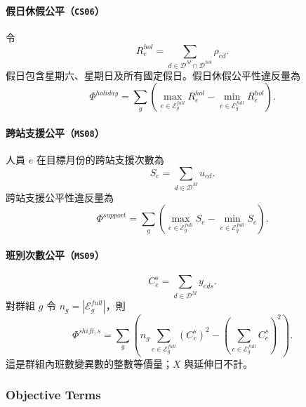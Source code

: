 \documentclass[12pt]{article}
\begin{document}
\paragraph{假日休假公平（\texttt{CS06}）}

令
\[
  R^{hol}_{e}
  =
  \sum_{d\in\mathcal{D}^{M}\cap\mathcal{D}^{hol}}\rho_{ed}.
\]
假日包含星期六、星期日及所有國定假日。假日休假公平性違反量為
\[
  \Phi^{holiday}
  =
  \sum_g
  \left(
    \max_{e\in\mathcal E^{full}_g}R^{hol}_{e}
    -
    \min_{e\in\mathcal E^{full}_g}R^{hol}_{e}
  \right).
\]

\paragraph{跨站支援公平（\texttt{MS08}）}

人員 \(e\) 在目標月份的跨站支援次數為
\[
  S_e
  =
  \sum_{d\in\mathcal{D}^{M}}u_{ed}.
\]
跨站支援公平性違反量為
\[
  \Phi^{support}
  =
  \sum_g
  \left(
    \max_{e\in\mathcal E^{full}_g}S_e
    -
    \min_{e\in\mathcal E^{full}_g}S_e
  \right).
\]

\paragraph{班別次數公平（\texttt{MS09}）}

\[
  C^s_e=\sum_{d\in\mathcal D^M}y_{eds}.
\]
對群組 \(g\) 令 \(n_g=|\mathcal E^{full}_g|\)，則
\[
  \Phi^{shift,s}
  =\sum_g\left(n_g\sum_{e\in\mathcal E^{full}_g}(C^s_e)^2
  -\left(\sum_{e\in\mathcal E^{full}_g}C^s_e\right)^2\right).
\]
這是群組內班數變異數的整數等價量；\(X\) 與延伸日不計。
\subsubsection{Objective Terms}
\end{document}
